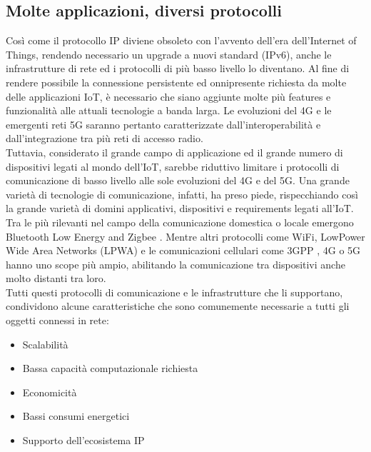 \subsection{Molte applicazioni, diversi protocolli}
Così come il protocollo IP diviene obsoleto con l'avvento dell'era dell'Internet of Things, rendendo necessario un upgrade a nuovi standard (IPv6), anche le infrastrutture di rete ed i protocolli di più basso livello lo diventano.
Al fine di rendere possibile la connessione persistente ed onnipresente richiesta da molte delle applicazioni IoT, è necessario che siano aggiunte molte più features e funzionalità alle attuali tecnologie a banda larga.
Le evoluzioni del 4G e le emergenti reti 5G saranno pertanto caratterizzate dall'interoperabilità e dall'integrazione tra più reti di accesso radio. \cite{famous:paper_Grieco_1}\\
Tuttavia, considerato il grande campo di applicazione ed il grande numero di dispositivi legati al mondo dell'IoT, sarebbe riduttivo limitare i protocolli di comunicazione di basso livello alle sole evoluzioni del 4G e del 5G. Una grande varietà di tecnologie di comunicazione, infatti, ha preso piede, rispecchiando così la grande varietà di domini applicativi, dispositivi e requirements legati all'IoT.
Tra le più rilevanti nel campo della comunicazione domestica o locale emergono Bluetooth Low Energy \cite{famous:paper_1} and Zigbee \cite{famous:paper_2}. Mentre altri protocolli come WiFi, LowPower Wide Area Networks (LPWA) \cite{famous:paper_3} e le comunicazioni cellulari come 3GPP , 4G o 5G \cite{famous:paper_Grieco_1} hanno uno scope più ampio, abilitando la comunicazione tra dispositivi anche molto distanti tra loro.\\
Tutti questi protocolli di comunicazione e le infrastrutture che li supportano, condividono alcune caratteristiche che sono comunemente necessarie a tutti gli oggetti connessi in rete:
\begin{itemize}
	\item Scalabilità
	\item Bassa capacità computazionale richiesta
	\item Economicità
	\item Bassi consumi energetici
	\item Supporto dell'ecosistema IP
\end{itemize}

